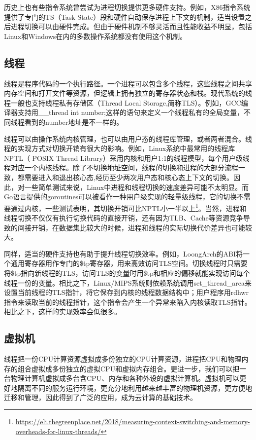 \documentclass[]{ctexbook}
\begin{document}
历史上也有些指令系统曾尝试为进程切换提供更多硬件支持。例如，X86指令系统提供了专门的TS（Task State）段和硬件自动保存进程上下文的机制，适当设置之后进程切换可以由硬件完成。但由于硬件机制不够灵活而且性能收益不明显，包括Linux和Windows在内的多数操作系统都没有使用这个机制。

\hypertarget{ux7ebfux7a0b}{%
\subsection{线程}\label{ux7ebfux7a0b}}

线程是程序代码的一个执行路径。一个进程可以包含多个线程，这些线程之间共享内存空间和打开文件等资源，但逻辑上拥有独立的寄存器状态和栈。现代系统的线程一般也支持线程私有存储区（Thread Local Storage,简称TLS）。例如，GCC编译器支持用\_\_thread int number;这样的语句来定义一个线程私有的全局变量，不同线程看到的number地址是不一样的。

线程可以由操作系统内核管理，也可以由用户态的线程库管理，或者两者混合。线程的实现方式对切换开销有很大的影响。例如，Linux系统中最常用的线程库NPTL（ POSIX Thread Library）采用内核和用户1:1的线程模型，每个用户级线程对应一个内核线程。除了不切换地址空间，线程的切换和进程的大部分流程一致，都需要进入和退出核心态,经历至少两次用户态和核心态上下文的切换。因此，对一些简单测试来说，Linux中进程和线程切换的速度差异可能不太明显。而Go语言提供的goroutines可以被看作一种用户级实现的轻量级线程，它的切换不需要通过内核，一些测试表明，其切换开销可比NPTL小一半以上\footnote{\url{https://eli.thegreenplace.net/2018/measuring-context-switching-and-memory-overheads-for-linux-threads/}}。当然，进程和线程切换不仅仅有执行切换代码的直接开销，还有因为TLB、Cache等资源竞争导致的间接开销，在数据集比较大的时候，进程和线程的实际切换代价差异也可能较大。

同样，适当的硬件支持也有助于提升线程切换效率。例如，LoongArch的ABI将一个通用寄存器用作专门的\$tp寄存器，用来高效访问TLS空间。切换线程时只需要将\$tp指向新线程的TLS，访问TLS的变量时用\$tp和相应的偏移就能实现访问每个线程一份的变量。相比之下，Linux/MIPS系统则依赖系统调用set\_thread\_area来设置当前线程的TLS指针，将它保存到内核的线程数据结构中；用户程序用rdhwr指令来读取当前的线程指针，这个指令会产生一个异常来陷入内核读取TLS指针。相比之下，这样的实现效率会低很多。

\hypertarget{ux865aux62dfux673a}{%
\subsection{虚拟机}\label{ux865aux62dfux673a}}

线程把一份CPU计算资源虚拟成多份独立的CPU计算资源，进程把CPU和物理内存的组合虚拟成多份独立的虚拟CPU和虚拟内存组合。更进一步，我们可以把一台物理计算机虚拟成多台含CPU、内存和各种外设的虚拟计算机。虚拟机可以更好地隔离不同的服务运行环境，更充分地利用越来越丰富的物理机资源，更方便地迁移和管理，因此得到了广泛的应用，成为云计算的基础技术。
\end{document}
